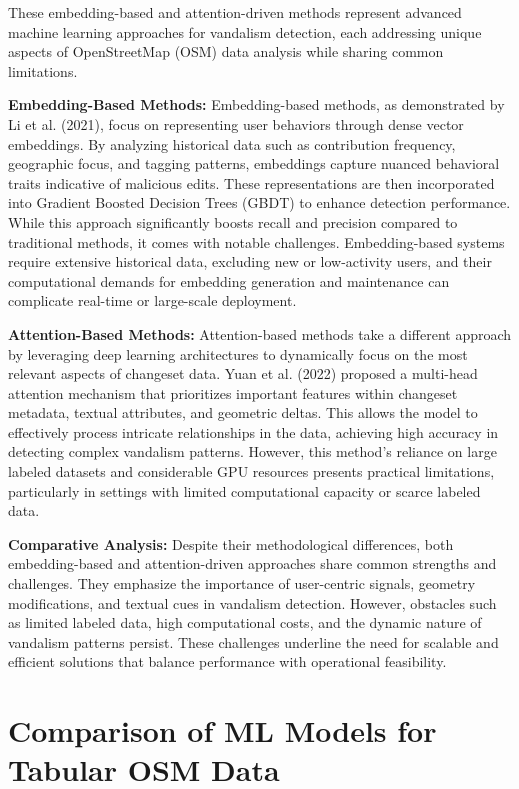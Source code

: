 \documentclass[
    13pt, %
    a4paper, %
    twoside, 
    DIV14, %
    listof=totoc, %
    bibliography=totoc, %
    index=totoc, %
    headsepline
]{scrreprt}
\begin{document}
These embedding-based and attention-driven methods represent advanced machine learning approaches for vandalism detection, each addressing unique aspects of OpenStreetMap (OSM) data analysis while sharing common limitations.

\textbf{Embedding-Based Methods:}  
Embedding-based methods, as demonstrated by Li et al. (2021), focus on representing user behaviors through dense vector embeddings. By analyzing historical data such as contribution frequency, geographic focus, and tagging patterns, embeddings capture nuanced behavioral traits indicative of malicious edits. These representations are then incorporated into Gradient Boosted Decision Trees (GBDT) to enhance detection performance. While this approach significantly boosts recall and precision compared to traditional methods, it comes with notable challenges. Embedding-based systems require extensive historical data, excluding new or low-activity users, and their computational demands for embedding generation and maintenance can complicate real-time or large-scale deployment.

\textbf{Attention-Based Methods:}  
Attention-based methods take a different approach by leveraging deep learning architectures to dynamically focus on the most relevant aspects of changeset data. Yuan et al. (2022) proposed a multi-head attention mechanism that prioritizes important features within changeset metadata, textual attributes, and geometric deltas. This allows the model to effectively process intricate relationships in the data, achieving high accuracy in detecting complex vandalism patterns. However, this method’s reliance on large labeled datasets and considerable GPU resources presents practical limitations, particularly in settings with limited computational capacity or scarce labeled data.

\textbf{Comparative Analysis:}  
Despite their methodological differences, both embedding-based and attention-driven approaches share common strengths and challenges. They emphasize the importance of user-centric signals, geometry modifications, and textual cues in vandalism detection. However, obstacles such as limited labeled data, high computational costs, and the dynamic nature of vandalism patterns persist. These challenges underline the need for scalable and efficient solutions that balance performance with operational feasibility.

\section{Comparison of ML Models for Tabular OSM Data}
\label{sec:ml_comparison_for_osm}
\end{document}
